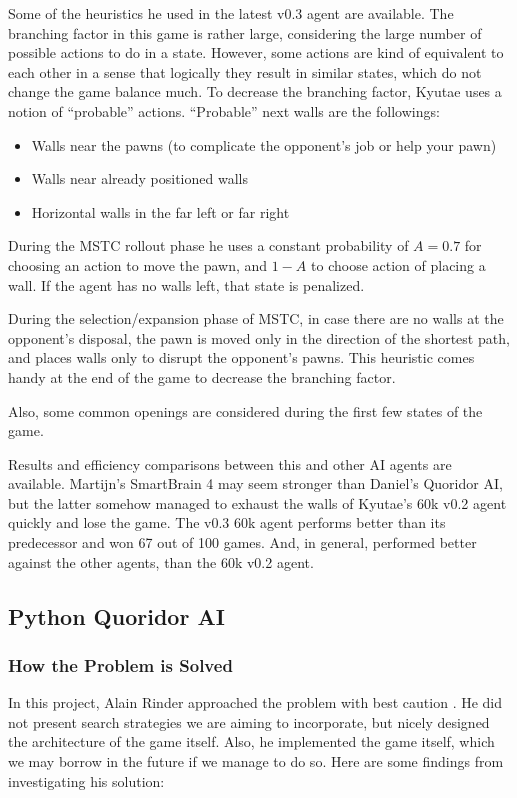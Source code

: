 \documentclass{article}
\begin{document}
	Some of the heuristics he used in the latest v0.3 agent are available. The branching factor in this game is rather large, considering the large number of possible actions to do in a state. However, some actions are kind of equivalent to each other in a sense that logically they result in similar states, which do not change the game balance much. To decrease the branching factor, Kyutae uses a notion of “probable” actions. “Probable” next walls are the followings: 
	\begin{itemize}
		\item Walls near the pawns (to complicate the opponent’s job or help your pawn)
		\item Walls near already positioned walls
		\item Horizontal walls in the far left or far right
	\end{itemize}
	
	During the MSTC rollout phase he uses a constant probability of $A=0.7$ for choosing an action to move the pawn, and $1-A$ to choose action of placing a wall. If the agent has no walls left, that state is penalized. 
	
	During the selection/expansion phase of MSTC, in case there are no walls at the opponent's disposal, the pawn is moved only in the direction of the shortest path, and places walls only to disrupt the opponent’s pawns. This heuristic comes handy at the end of the game to decrease the branching factor. 
	
	Also, some common openings are considered during the first few states of the game.
	
	Results and efficiency comparisons between this and other AI agents are available. Martijn's SmartBrain 4 may seem stronger than Daniel's Quoridor AI, but the latter somehow managed to exhaust the walls of Kyutae’s 60k v0.2 agent quickly and lose the game. The v0.3 60k agent performs better than its predecessor and won 67 out of 100 games. And, in general, performed better against the other agents, than the 60k v0.2 agent.

\subsection{Python Quoridor AI}
\subsubsection{How the Problem is Solved}

In this project, Alain Rinder approached the problem with best caution \cite{closest_impl}. He did not present search strategies we are aiming to incorporate, but nicely designed the architecture of the game itself. Also, he implemented the game itself, which we may borrow in the future if we manage to do so. Here are some findings from investigating his solution:
\end{document}
